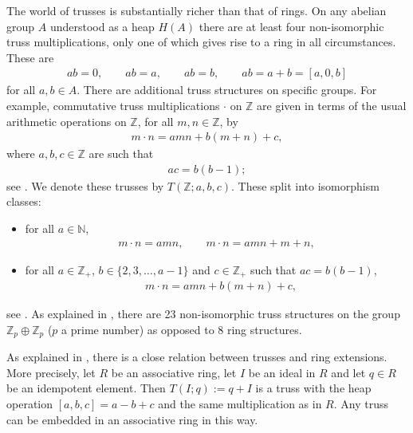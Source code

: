 \documentclass[10pt,a4paper]{amsart}
\numberwithin{equation}{section}
\newcommand{\N}{\mathbb N}
\newcommand{\Z}{\mathbb Z}
\begin{document}
\begin{Remark}\label{rem.trusses} The world of trusses is substantially richer than that of rings. On any abelian group $A$ understood as a heap $H(A)$ there are at least four non-isomorphic truss multiplications, only one of which gives rise to a ring in all circumstances. These are
\begin{gather}\label{truss.ab}
ab = 0, \qquad ab=a, \qquad ab=b, \qquad ab=a+b= [a,0,b]
\end{gather}
for all $a,b\in A$. There are additional truss structures on specific groups. For example, commutative truss multiplications $\cdot$ on $\Z$ are given in terms of the usual arithmetic operations on $\Z$, for all $m,n\in \Z$, by
\begin{gather}\label{truss.z}
 m\cdot n =amn +b(m+n) +c,
\end{gather}
where $a,b,c\in \Z$ are such that
\begin{gather}\label{truss.z.constraint}
 ac=b(b-1);
\end{gather}
see \cite[Theorem~3.51]{Brz:par}. We denote these trusses by $T(\Z;a,b,c)$. These split into isomorphism classes:
\begin{itemize}\itemsep=0pt
 \item[(1)] for all $a\in \N$,
\begin{align*}%
m\cdot n = amn,\qquad
m\cdot n = amn + m +n,
\end{align*}
\item[(2)] for all $a\in \Z_+$, $b\in \{2,3,\dots,a-1\}$ and $c\in \Z_+$ such that $ac = b(b-1)$,
\begin{align*}
&m\cdot n = amn +b(m+n) +c,
\end{align*}
\end{itemize}
see \cite[Corollary~3.53]{Brz:par}. As explained in \cite[Example~7.4]{AndBrzRyb:ext}, there are 23 non-isomorphic truss structures on the group $\Z_p\oplus \Z_p$ ($p$ a prime number) as opposed to 8 ring structures.
\end{Remark}

\begin{Remark}\label{rem.ideal}
 As explained in \cite{AndBrzRyb:ext}, there is a close relation between trusses and ring extensions. More precisely, let $R$ be an associative ring, let $I$ be an ideal in $R$ and let $q\in R$ be an idempotent element. Then
$ T(I;q) := q +I$
 is a truss with the heap operation $[a,b,c]=a-b+c$ and the same multiplication as in $R$. Any truss can be embedded in an associative ring in this way.
 \end{Remark}
\end{document}
